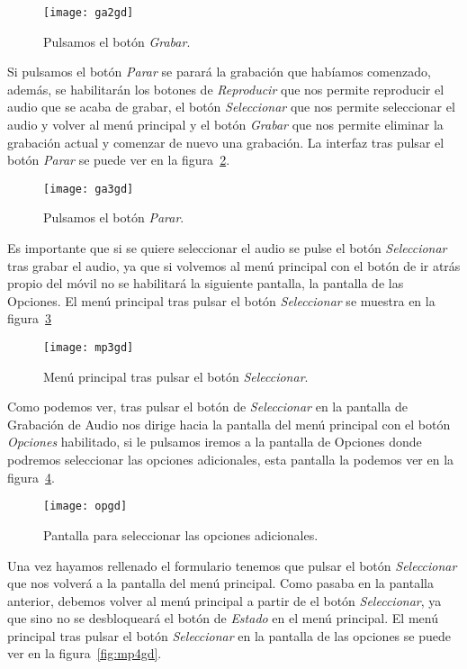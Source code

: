 \begin{figure}[htb]
	\centering
	\texttt{[image: ga2gd]}
	\caption{Pulsamos el botón \textit{Grabar}.}
	\label{fig:ga2gd}
\end{figure}

Si pulsamos el botón \textit{Parar} se parará la grabación que habíamos comenzado, además, se habilitarán los botones de \textit{Reproducir} que nos permite reproducir el audio que se acaba de grabar, el botón \textit{Seleccionar} que nos permite seleccionar el audio y volver al menú principal y el botón \textit{Grabar} que nos permite eliminar la grabación actual y comenzar de nuevo una grabación. La interfaz tras pulsar el botón \textit{Parar} se puede ver en la figura~\ref{fig:ga3gd}.

\begin{figure}[H]
	\centering
	\texttt{[image: ga3gd]}
	\caption{Pulsamos el botón \textit{Parar}.}
	\label{fig:ga3gd}
\end{figure}

Es importante que si se quiere seleccionar el audio se pulse el botón \textit{Seleccionar} tras grabar el audio, ya que si volvemos al menú principal con el botón de ir atrás propio del móvil no se habilitará la siguiente pantalla, la pantalla de las Opciones. El menú principal tras pulsar el botón \textit{Seleccionar} se muestra en la figura~\ref{fig:mp3gd}

\begin{figure}
	\centering
	\texttt{[image: mp3gd]}
	\caption{Menú principal tras pulsar el botón \textit{Seleccionar}.}
	\label{fig:mp3gd}
\end{figure}

Como podemos ver, tras pulsar el botón de \textit{Seleccionar} en la pantalla de Grabación de Audio nos dirige hacia la pantalla del menú principal con el botón \textit{Opciones} habilitado, si le pulsamos iremos a la pantalla de Opciones donde podremos seleccionar las opciones adicionales, esta pantalla la podemos ver en la figura~\ref{fig:opgd}.

\begin{figure}[H]
	\centering
	\texttt{[image: opgd]}
	\caption{Pantalla para seleccionar las opciones adicionales.}
	\label{fig:opgd}
\end{figure}

Una vez hayamos rellenado el formulario tenemos que pulsar el botón \textit{Seleccionar} que nos volverá a la pantalla del menú principal. Como pasaba en la pantalla anterior, debemos volver al menú principal a partir de el botón \textit{Seleccionar}, ya que sino no se desbloqueará el botón de \textit{Estado} en el menú principal. El menú principal tras pulsar el botón \textit{Seleccionar} en la pantalla de las opciones se puede ver en la figura~\ref{fig:mp4gd}.


